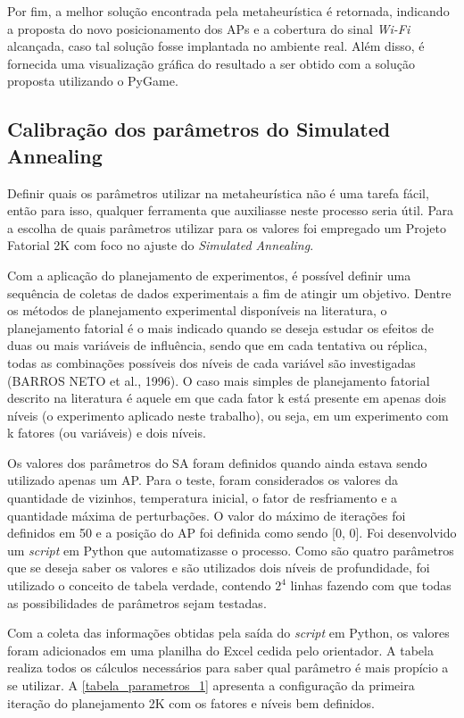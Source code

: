 \documentclass[
	12pt,				%
	openright,			%
	twoside,			%
	a4paper,			%
	english,			%
	french,				%
	spanish,			%
	brazil				%
	]{abntex2}
\begin{document}
Por fim, a melhor solução encontrada pela metaheurística é retornada, indicando a proposta do novo posicionamento dos APs e a cobertura do sinal \textit{Wi-Fi} alcançada, caso tal solução fosse implantada no ambiente real. Além disso, é fornecida uma visualização gráfica do resultado a ser obtido com a solução proposta utilizando o PyGame.


\subsection[Calibração dos parâmetros do Simulated Annealing]{Calibração dos parâmetros do Simulated Annealing}

Definir quais os parâmetros utilizar na metaheurística não é uma tarefa fácil, então para isso, qualquer ferramenta que auxiliasse neste processo seria útil. Para a escolha de quais parâmetros utilizar para os valores foi empregado um Projeto Fatorial 2K com foco no ajuste do \textit{Simulated Annealing}. 

Com a aplicação do planejamento de experimentos, é possível definir uma sequência de coletas de dados experimentais a fim de atingir um objetivo. Dentre os métodos de planejamento experimental disponíveis na literatura, o planejamento fatorial  é o mais indicado quando se deseja estudar os efeitos de duas ou mais variáveis de influência, sendo que em cada tentativa ou réplica, todas as combinações possíveis dos níveis de cada variável são investigadas (BARROS NETO et al., 1996). O caso mais simples de planejamento fatorial descrito na literatura é aquele em que cada fator k está presente em apenas dois níveis (o experimento aplicado neste trabalho), ou seja, em um experimento com k fatores (ou variáveis) e dois níveis.

Os valores dos parâmetros do SA foram definidos quando ainda estava sendo utilizado apenas um AP. Para o teste, foram considerados os valores da quantidade de vizinhos, temperatura inicial, o fator de resfriamento e a quantidade máxima de perturbações. O valor do máximo de iterações foi definidos em 50 e a posição do AP foi definida como sendo [0, 0]. Foi desenvolvido um \textit{script} em Python que automatizasse o processo. Como são quatro parâmetros que se deseja saber os valores e são utilizados dois níveis de profundidade, foi utilizado o conceito de tabela verdade, contendo $ 2^{4} $ linhas fazendo com que todas as possibilidades de parâmetros sejam testadas.

Com a coleta das informações obtidas pela saída do \textit{script} em Python, os valores foram adicionados em uma planilha do Excel cedida pelo orientador. A tabela realiza todos os cálculos necessários para saber qual parâmetro é mais propício a se utilizar. A \autoref{tabela_parametros_1} apresenta a configuração da primeira iteração do planejamento 2K com os fatores e níveis bem definidos.
	
\end{document}
